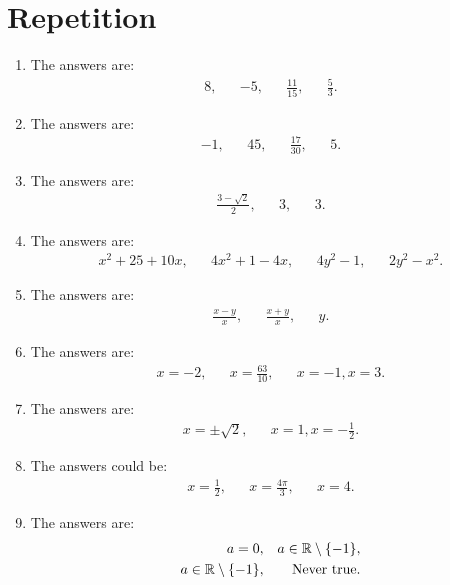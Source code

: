 \section{Repetition}
\begin{enumerate}
	\item The answers are:
	\begin{align*}
	8,&& -5,&& \frac{11}{15},&& \frac{5}{3}.
	\end{align*}
	
	\item The answers are:
	\begin{align*}
	-1,&& 45,&&\frac{17}{30},&& 5.
	\end{align*}
	
	\item The answers are:
	\begin{align*}
	\frac{3-\sqrt{2}}{2},&& 3,&& 3.
	\end{align*}
	
	\item The answers are:
	\begin{align*}
	x^2+25+10x,&& 4x^2+1-4x,&& 4y^2-1,&& 2y^2-x^2.
	\end{align*}
	
	\item The answers are:
	\begin{align*}
	\frac{x-y}{x},&& \frac{x+y}{x},&& y.
	\end{align*}
	
	\item The answers are:
	\begin{align*}
	x=-2,&& x=\frac{63}{10},&&x=-1, x=3.
	\end{align*}
	
	\item The answers are:
	\begin{align*}
	x=\pm \sqrt{2},&& x=1,x=-\frac{1}{2}.
	\end{align*}
	
	\item The answers could be:
	\begin{align*}
	x=\frac{1}{2},&& x=\frac{4\pi}{3},&& x=4.
	\end{align*}
	
	\item The answers are:
	\begin{align*}
	a=0,&& a\in \mathbb{R}\setminus\{-1\},\\
	a\in\mathbb{R}\setminus\{-1\},&& \textup{Never true}.
	\end{align*}
	

\end{enumerate}
